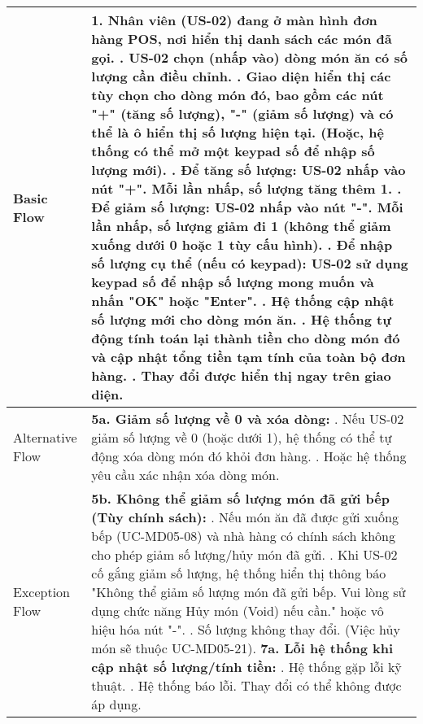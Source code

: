 \begin{longtable}{|m{4cm}|p{11cm}|}
\hline
Basic Flow & 1. Nhân viên (US-02) đang ở màn hình đơn hàng POS, nơi hiển thị danh sách các món đã gọi. \newline 2. US-02 chọn (nhấp vào) dòng món ăn có số lượng cần điều chỉnh. \newline 3. Giao diện hiển thị các tùy chọn cho dòng món đó, bao gồm các nút "+" (tăng số lượng), "-" (giảm số lượng) và có thể là ô hiển thị số lượng hiện tại. (Hoặc, hệ thống có thể mở một keypad số để nhập số lượng mới). \newline 4. \textbf{Để tăng số lượng:} US-02 nhấp vào nút "+". Mỗi lần nhấp, số lượng tăng thêm 1. \newline 5. \textbf{Để giảm số lượng:} US-02 nhấp vào nút "-". Mỗi lần nhấp, số lượng giảm đi 1 (không thể giảm xuống dưới 0 hoặc 1 tùy cấu hình). \newline 6. \textbf{Để nhập số lượng cụ thể (nếu có keypad):} US-02 sử dụng keypad số để nhập số lượng mong muốn và nhấn "OK" hoặc "Enter". \newline 7. Hệ thống cập nhật số lượng mới cho dòng món ăn. \newline 8. Hệ thống tự động tính toán lại thành tiền cho dòng món đó và cập nhật tổng tiền tạm tính của toàn bộ đơn hàng. \newline 9. Thay đổi được hiển thị ngay trên giao diện. \\
\hline
Alternative Flow & \textbf{5a. Giảm số lượng về 0 và xóa dòng:} \newline    1. Nếu US-02 giảm số lượng về 0 (hoặc dưới 1), hệ thống có thể tự động xóa dòng món đó khỏi đơn hàng. \newline    2. Hoặc hệ thống yêu cầu xác nhận xóa dòng món. \\
\hline
Exception Flow & \textbf{5b. Không thể giảm số lượng món đã gửi bếp (Tùy chính sách):} \newline    1. Nếu món ăn đã được gửi xuống bếp (UC-MD05-08) và nhà hàng có chính sách không cho phép giảm số lượng/hủy món đã gửi. \newline    2. Khi US-02 cố gắng giảm số lượng, hệ thống hiển thị thông báo "Không thể giảm số lượng món đã gửi bếp. Vui lòng sử dụng chức năng Hủy món (Void) nếu cần." hoặc vô hiệu hóa nút "-". \newline    3. Số lượng không thay đổi. (Việc hủy món sẽ thuộc UC-MD05-21). \newline \textbf{7a. Lỗi hệ thống khi cập nhật số lượng/tính tiền:} \newline    1. Hệ thống gặp lỗi kỹ thuật. \newline    2. Hệ thống báo lỗi. Thay đổi có thể không được áp dụng. \\

\end{longtable}
